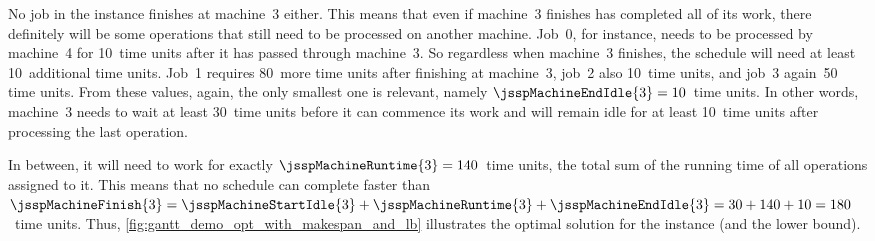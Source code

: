 No job in the  instance finishes at machine~3 either.
This means that even if machine~3 finishes has completed all of its work, there definitely will be some operations that still need to be processed on another machine.
Job~0, for instance, needs to be processed by machine~4 for 10~time units after it has passed through machine~3.
So regardless when machine~3 finishes, the schedule will need at least 10~additional time units.
Job~1 requires 80~more time units after finishing at machine~3, job~2 also 10~time units, and job~3 again~50 time units.
From these values, again, the only smallest one is relevant, namely $\jsspMachineEndIdle{3}=10$~time units.
In other words, machine~3 needs to wait at least 30~time units before it can commence its work and will remain idle for at least 10~time units after processing the last operation.

In between, it will need to work for exactly $\jsspMachineRuntime{3}=140$~time units, the total sum of the running time of all operations assigned to it.
This means that no schedule can complete faster than $\jsspMachineFinish{3}=\jsspMachineStartIdle{3}+\jsspMachineRuntime{3}+\jsspMachineEndIdle{3}=30+140+10=180$~time units.
Thus, \cref{fig:gantt_demo_opt_with_makespan_and_lb} illustrates the optimal solution for the  instance (and the lower bound).

